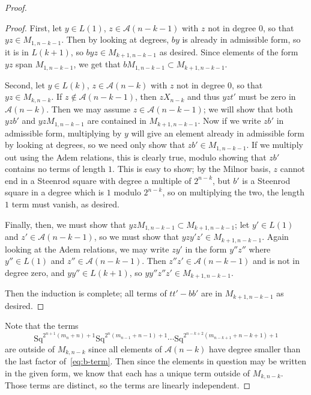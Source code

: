 \documentclass{article}
\newcommand{\A}{\mathcal{A}}
\newcommand{\Sq}{\mathrm{Sq}}
\begin{document}
\begin{proof}
\begin{proof}
  First, let $y\in L(1)$, $z\in \A(n-k-1)$ with $z$ not in degree $0$, so that $yz\in M_{1,n-k-1}$.  Then by looking at degrees, $by$ is already in admissible form, so it is in $L(k+1)$, so $byz\in M_{k+1,n-k-1}$ as desired.  Since elements of the form $yz$ span $M_{1,n-k-1}$, we get that $bM_{1,n-k-1}\subset M_{k+1,n-k-1}$.

  Second, let $y\in L(k)$, $z\in \A(n-k)$ with $z$ not in degree $0$, so that $yz\in M_{k,n-k}$.  If $z\not\in\A(n-k-1)$, then $zX_{n-k}$ and thus $yzt'$ must be zero in $\A(n-k)$.  Then we may assume $z\in\A(n-k-1)$; we will show that both $yzb'$ and $yzM_{1,n-k-1}$ are contained in $M_{k+1,n-k-1}$.  Now if we write $zb'$ in admissible form, multiplying by $y$ will give an element already in admissible form by looking at degrees, so we need only show that $zb'\in M_{1,n-k-1}$.  If we multiply out using the Adem relations, this is clearly true, modulo showing that $zb'$ contains no terms of length $1$.  This is easy to show; by the Milnor basis, $z$ cannot end in a Steenrod square with degree a multiple of $2^{n-k}$, but $b'$ is a Steenrod square in a degree which is $1$ modulo $2^{n-k}$, so on multiplying the two, the length $1$ term must vanish, as desired.

  Finally, then, we must show that $yzM_{1,n-k-1}\subset M_{k+1,n-k-1}$; let $y'\in L(1)$ and $z'\in\A(n-k-1)$, so we must show that $yzy'z'\in M_{k+1,n-k-1}$.  Again looking at the Adem relations, we may write $zy'$ in the form $y''z''$ where $y''\in L(1)$ and $z''\in\A(n-k-1)$.  Then $z''z'\in \A(n-k-1)$ and is not in degree zero, and $yy''\in L(k+1)$, so $yy''z''z'\in M_{k+1,n-k-1}$.

  Then the induction is complete; all terms of $tt'-bb'$ are in $M_{k+1,n-k-1}$ as desired.
  \end{proof}

  Note that the terms 
\begin{equation}\Sq^{2^{n+1}(m_n+n)+1}\Sq^{2^n(m_{n-1}+n-1)+1}\cdots\Sq^{2^{n-k+2}(m_{n-k+1}+n-k+1)+1}\label{eq:b-term}\end{equation}
  are outside of $M_{k, n-k}$ since all elements of $\A(n-k)$ have degree smaller than the last factor of~\eqref{eq:b-term}.  Then since the elements in question may be written in the given form, we know that each has a unique term outside of $M_{k, n-k}$.  Those terms are distinct, so the terms are linearly independent.
\end{proof}
\end{document}
